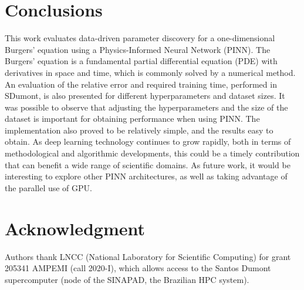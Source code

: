 \documentclass[conference]{IEEEtran}
\begin{document}
\section{Conclusions}\label{sec:conc}

This work evaluates data-driven parameter discovery for a one-dimensional Burgers' equation using a Physics-Informed Neural Network (PINN). The Burgers' equation is a fundamental partial differential equation (PDE) with derivatives in space and time, which is commonly solved by a numerical method. An evaluation of the relative error and required training time, performed in SDumont, is also presented for different hyperparameters and dataset sizes. It was possible to observe that adjusting the hyperparameters and the size of the dataset is important for obtaining performance when using PINN. The implementation also proved to be relatively simple, and the results easy to obtain. As deep learning technology continues to grow rapidly, both in terms of methodological and algorithmic developments, this could be a timely contribution that can benefit a wide range of scientific domains.
As future work, it would be interesting to explore other PINN architectures, as well as taking advantage of the parallel use of GPU.

\section*{Acknowledgment}

Authors thank LNCC (National Laboratory for Scientific Computing) for grant 205341 AMPEMI (call 2020-I), which allows access to the Santos Dumont supercomputer (node of the SINAPAD, the Brazilian HPC system).




\FloatBarrier



\end{document}

